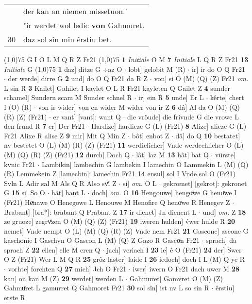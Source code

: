 \documentclass[8pt,a4paper,notitlepage]{article}
\begin{document}
\begin{table}[ht]
\begin{minipage}[t]{0.5\linewidth}
\begin{tabular}{rl}
 & der kan an niemen missetuon."\\ 
 & "ir werdet wol ledic \textbf{von} Gahmuret.\\ 
30 & daz sol sîn mîn êrstiu bet.\\ 
\end{tabular}
\scriptsize
\line(1,0){75} \newline
G I O L M Q R Z Fr21 \newline
\line(1,0){75} \newline
\textbf{1} \textit{Initiale} O M  \textbf{7} \textit{Initiale} L Q R Z Fr21  \textbf{13} \textit{Initiale} G  \newline
\line(1,0){75} \newline
\textbf{1} daz] ditze G ÷az O  $\cdot$ lobt] gelobit M (R)  $\cdot$ ir] ir do O Q Fr21  $\cdot$ der werde] dirre G \textbf{2} und] do O Q Fr21 da R Z  $\cdot$ von] si O (M) (Q) (Z) Fr21 \textit{om.} L sin R \textbf{3} Kailet] Gahilet I kaylet O L R Fr21 kayleten Q Gailet Z \textbf{4} sunder schamel] Sundern scam M Sunder schnel R  $\cdot$ ir] ein R \textbf{5} unde] Er L  $\cdot$ kêrte] chert I (O) (R)  $\cdot$ von ir wider] von en wider M wider von ir Z \textbf{6} dâ] Al da O (M) (Q) (R) (Z) (Fr21)  $\cdot$ er vant] [vant]: want Q  $\cdot$ die vröude] die frivnde G die vrowe L den frund R \textbf{7} er] Der Fr21  $\cdot$ Hardize] hardieze G (L) (Fr21) \textbf{8} Alize] alieze G (L) Fr21 Alixe R alise Z \textbf{9} mir] Mit Q Min Z  $\cdot$ bôt] enbot Z  $\cdot$ dâ] do Q \textbf{10} bestatet] nv bestetet O (L) (M) (R) (Z) (Fr21) \textbf{11} werdiclîcher] Vnde werdechlicher O (L) (M) (Q) (R) (Z) (Fr21) \textbf{12} durch] Doch Q  $\cdot$ lât] laz M \textbf{13} hât] bat Q  $\cdot$ vürste] kvnic Fr21  $\cdot$ Lambikin] lambechin G lambekin I lamechin O Lammekin L (M) (Q) (R) Lemmekein Z [lamecbin]: lamechin Fr21 \textbf{14} ensul] sol I Vnde sol O (Fr21) Svln L Adir sal M Als Q R Also svͤl Z  $\cdot$ si] \textit{om.} O L  $\cdot$ gekrœnet] [gekrot]: gekronet G \textbf{15} si] So O  $\cdot$ hât] hant L  $\cdot$ doch] \textit{om.} O \textbf{16} Hengouwe] hengoͮwe G henoͮwe I (Fr21) Heͮnawe O Henegowe L Henouwe M Henofire Q henoͯwe R Henegev Z  $\cdot$ Brabant] [bra*]: brabant Q Prabant Z \textbf{17} ir dienet] Jn dienent L  $\cdot$ und] \textit{om.} Z \textbf{18} ze gruoze] zegrvͦzen O (M) (Q) (Z) (Fr21) \textbf{19} iweren hulden] v́wer hulde R \textbf{20} nemet] Vnde nempt O (L) (M) (Q) (R) (Z) Vnde nem Fr21 \textbf{21} Gascone] ascone G kaschonie I Gaschvn O Gascon L (M) (Q) Z Gazo R Gascoͮn Fr21  $\cdot$ sprach] da sprach Z \textbf{22} ellen] elle M eren Q  $\cdot$ jach] veriach I \textbf{23} ie] ê O (Fr21) \textbf{24} der] Swer O Z (Fr21) Wer L M Q R \textbf{25} grôz laster] laide I \textbf{26} iedoch] doch I L (M) Q ye R  $\cdot$ vorhte] forchten Q \textbf{27} mich] Jch O Fr21  $\cdot$ iwer] iwern O Fr21 dach uwer M \textbf{28} kan] on kan M (Z) \textbf{29} werdet] werden L  $\cdot$ Gahmuret] Gamvret O (M) (Z) Gahmuͦret L gamurret Q Gahmoret Fr21 \textbf{30} sol sîn] ist nv L so sin R  $\cdot$ êrstiu] erste R \newline

\end{minipage}
\end{table}
\end{document}
